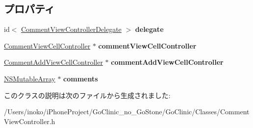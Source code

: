 \subsection*{プロパティ}
\begin{DoxyCompactItemize}
\item 
\hypertarget{interface_comment_view_controller_a203cee689b101f2f89c363dc9d345e06}{
id$<$ \hyperlink{protocol_comment_view_controller_delegate-p}{CommentViewControllerDelegate} $>$ {\bfseries delegate}}
\label{interface_comment_view_controller_a203cee689b101f2f89c363dc9d345e06}

\item 
\hypertarget{interface_comment_view_controller_adbd94088fcfd1ea96ceaf2cade39ff67}{
\hyperlink{interface_comment_view_cell_controller}{CommentViewCellController} $\ast$ {\bfseries commentViewCellController}}
\label{interface_comment_view_controller_adbd94088fcfd1ea96ceaf2cade39ff67}

\item 
\hypertarget{interface_comment_view_controller_af088ffae53763789bb354b31037426d5}{
\hyperlink{interface_comment_add_view_cell_controller}{CommentAddViewCellController} $\ast$ {\bfseries commentAddViewCellController}}
\label{interface_comment_view_controller_af088ffae53763789bb354b31037426d5}

\item 
\hypertarget{interface_comment_view_controller_a6a418f2ae7d6d0f0bfc13a7ae7426857}{
\hyperlink{class_n_s_mutable_array}{NSMutableArray} $\ast$ {\bfseries comments}}
\label{interface_comment_view_controller_a6a418f2ae7d6d0f0bfc13a7ae7426857}

\end{DoxyCompactItemize}


このクラスの説明は次のファイルから生成されました:\begin{DoxyCompactItemize}
\item 
/Users/inoko/iPhoneProject/GoClinic\_\-no\_\-GoStone/GoClinic/Classes/CommentViewController.h\end{DoxyCompactItemize}
